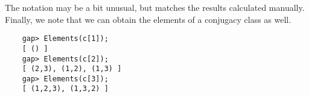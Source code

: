 The notation may be a bit unusual, but matches the results calculated manually. Finally, we note that we can obtain the elements of a conjugacy class as well.

\begin{verbatim}
    gap> Elements(c[1]);
    [ () ]
    gap> Elements(c[2]);
    [ (2,3), (1,2), (1,3) ]
    gap> Elements(c[3]);
    [ (1,2,3), (1,3,2) ]
\end{verbatim}



